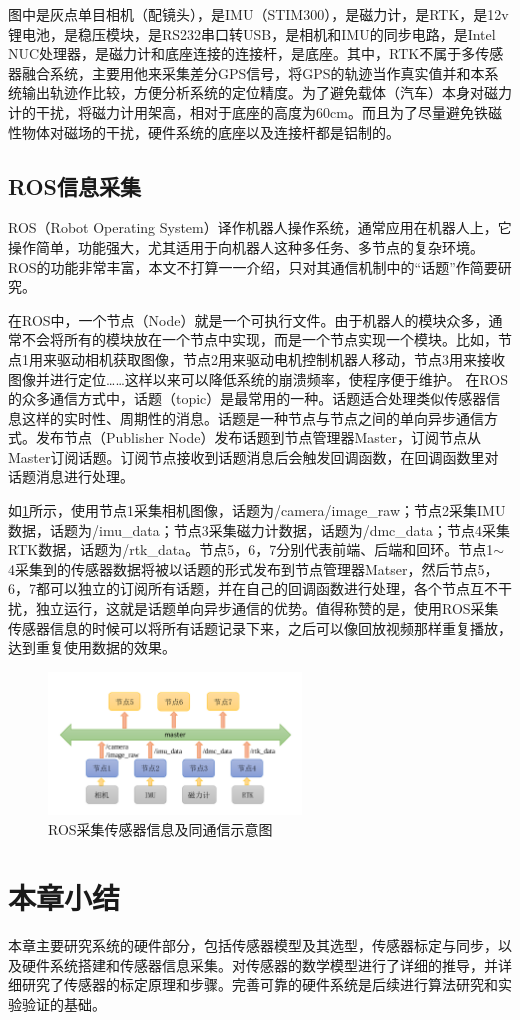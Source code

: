 图中是灰点单目相机（配镜头），是IMU（STIM300），是磁力计，是RTK，是12v锂电池，是稳压模块，是RS232串口转USB，是相机和IMU的同步电路，是Intel NUC处理器，是磁力计和底座连接的连接杆，是底座。其中，RTK不属于多传感器融合系统，主要用他来采集差分GPS信号，将GPS的轨迹当作真实值并和本系统输出轨迹作比较，方便分析系统的定位精度。为了避免载体（汽车）本身对磁力计的干扰，将磁力计用架高，相对于底座的高度为60cm。而且为了尽量避免铁磁性物体对磁场的干扰，硬件系统的底座以及连接杆都是铝制的。
\subsection{ROS信息采集}
ROS（Robot Operating System）译作机器人操作系统，通常应用在机器人上，它操作简单，功能强大，尤其适用于向机器人这种多任务、多节点的复杂环境。ROS的功能非常丰富，本文不打算一一介绍，只对其通信机制中的“话题”作简要研究。

在ROS中，一个节点（Node）就是一个可执行文件。由于机器人的模块众多，通常不会将所有的模块放在一个节点中实现，而是一个节点实现一个模块。比如，节点1用来驱动相机获取图像，节点2用来驱动电机控制机器人移动，节点3用来接收图像并进行定位……这样以来可以降低系统的崩溃频率，使程序便于维护。
在ROS的众多通信方式中，话题（topic）是最常用的一种。话题适合处理类似传感器信息这样的实时性、周期性的消息。话题是一种节点与节点之间的单向异步通信方式。发布节点（Publisher Node）发布话题到节点管理器Master，订阅节点从Master订阅话题。订阅节点接收到话题消息后会触发回调函数，在回调函数里对话题消息进行处理。

如\ref{fig2_21}所示，使用节点1采集相机图像，话题为/camera/image\_raw；节点2采集IMU数据，话题为/imu\_data；节点3采集磁力计数据，话题为/dmc\_data；节点4采集RTK数据，话题为/rtk\_data。节点5，6，7分别代表前端、后端和回环。节点1$\sim$ 4采集到的传感器数据将被以话题的形式发布到节点管理器Matser，然后节点5，6，7都可以独立的订阅所有话题，并在自己的回调函数进行处理，各个节点互不干扰，独立运行，这就是话题单向异步通信的优势。值得称赞的是，使用ROS采集传感器信息的时候可以将所有话题记录下来，之后可以像回放视频那样重复播放，达到重复使用数据的效果。
\begin{figure}[h]\setlength{\belowcaptionskip}{-12pt}
	\centering
	\includegraphics[width=0.6\textwidth]{figures/chapter2/fig2_21}
	\caption{ROS采集传感器信息及同通信示意图}\label{fig2_21}
\end{figure}
\section{本章小结}
本章主要研究系统的硬件部分，包括传感器模型及其选型，传感器标定与同步，以及硬件系统搭建和传感器信息采集。对传感器的数学模型进行了详细的推导，并详细研究了传感器的标定原理和步骤。完善可靠的硬件系统是后续进行算法研究和实验验证的基础。